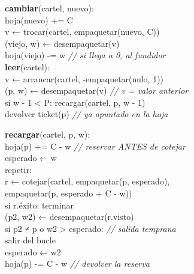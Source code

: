 \begin{pizarra}
\ttfamily\footnotesize
\textbf{cambiar}(cartel, nuevo):\\
\hspace*{1.2em}hoja(nuevo) += C\\
\hspace*{1.2em}v ← trocar(cartel, empaquetar(nuevo, C))\\
\hspace*{1.2em}(viejo, w) ← desempaquetar(v)\\
\hspace*{1.2em}hoja(viejo) -= w \quad\textrm{\itshape // si llega a 0, al fundidor}\\[2mm]
\textbf{leer}(cartel):\\
\hspace*{1.2em}v ← arrancar(cartel, -empaquetar(nulo, 1))\\
\hspace*{1.2em}(p, w) ← desempaquetar(v) \quad\textrm{\itshape // v = valor anterior}\\
\hspace*{1.2em}si w - 1 < P: recargar(cartel, p, w - 1)\\
\hspace*{1.2em}devolver ticket(p) \quad\textrm{\itshape // ya apuntado en la hoja}
\end{pizarra}

\begin{pizarra}
\ttfamily\footnotesize
\textbf{recargar}(cartel, p, w):\\
\hspace*{1.2em}hoja(p) += C - w \quad\textrm{\itshape // reservar ANTES de cotejar}\\
\hspace*{1.2em}esperado ← w\\
\hspace*{1.2em}repetir:\\
\hspace*{2.4em}r ← cotejar(cartel, empaquetar(p, esperado),\\
\hspace*{8.4em}empaquetar(p, esperado + C - w))\\
\hspace*{2.4em}si r.éxito: terminar\\
\hspace*{2.4em}(p2, w2) ← desempaquetar(r.visto)\\
\hspace*{2.4em}si p2 ≠ p o w2 > esperado: \textrm{\itshape // salida temprana}\\
\hspace*{3.5999999999999996em}salir del bucle\\
\hspace*{2.4em}esperado ← w2\\
\hspace*{1.2em}hoja(p) -= C - w \quad\textrm{\itshape // devolver la reserva}
\end{pizarra}

